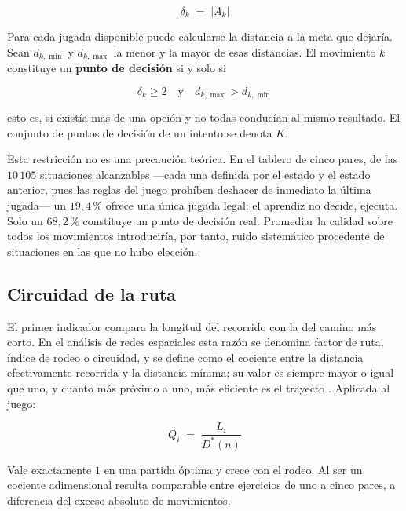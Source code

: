 \documentclass{book}
\begin{document}
\begin{equation}
    \delta_k \;=\; |A_k|
    \label{eq:grados_libertad}
\end{equation}

Para cada jugada disponible puede calcularse la distancia a la meta
que dejaría. Sean $d_{k,\min}$ y $d_{k,\max}$ la menor y la mayor de
esas distancias. El movimiento $k$ constituye un
\textbf{punto de decisión} si y solo si

\begin{equation}
    \delta_k \geq 2 \quad \text{y} \quad d_{k,\max} > d_{k,\min}
    \label{eq:punto_decision}
\end{equation}

esto es, si existía más de una opción y no todas conducían al mismo
resultado. El conjunto de puntos de decisión de un intento se
denota $K$.

Esta restricción no es una precaución teórica. En el tablero de
cinco pares, de las $10\,105$ situaciones alcanzables —cada una
definida por el estado y el estado anterior, pues las reglas del
juego prohíben deshacer de inmediato la última jugada— un
$19{,}4\,\%$ ofrece una única jugada legal: el aprendiz no decide,
ejecuta. Solo un $68{,}2\,\%$ constituye un punto de decisión real.
Promediar la calidad sobre todos los movimientos introduciría, por
tanto, ruido sistemático procedente de situaciones en las que no
hubo elección.

\subsection*{Circuidad de la ruta}

El primer indicador compara la longitud del recorrido con la del
camino más corto. En el análisis de redes espaciales esta razón se
denomina factor de ruta, índice de rodeo o circuidad, y se define
como el cociente entre la distancia efectivamente recorrida y la
distancia mínima; su valor es siempre mayor o igual que uno, y
cuanto más próximo a uno, más eficiente es el trayecto
\cite{Barthelemy2011}. Aplicada al juego:

\begin{equation}
    Q_i \;=\; \frac{L_i}{D^{*}(n)}
    \label{eq:circuidad}
\end{equation}

Vale exactamente $1$ en una partida óptima y crece con el rodeo. Al
ser un cociente adimensional resulta comparable entre ejercicios de
uno a cinco pares, a diferencia del exceso absoluto de movimientos.
\end{document}
